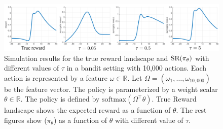 \begin{figure}[t]
\begin{center}
\includegraphics[width=1.0\linewidth]{./sr_simulation.pdf}
\end{center}
\caption{
Simulation results for the true reward landscape and $\text{SR}(\pi_\theta)$
with different values of $\tau$ in a bandit setting with 10,000 actions. Each action is represented by a feature $\omega\in \mathbb{R}$. Let $\Omega = \left( \omega_1, \dots, \omega_{10,000} \right)$ be the feature vector. The policy is parameterized by a weight scalar $\theta\in \mathbb{R}$. The policy is defined by $\text{softmax}(\Omega^{\top}\theta)$. True Reward landscape shows the expected reward as a function of $\theta$. The rest figures show \SR($\pi_\theta$) as a function of $\theta$ with different value of $\tau$.}
\label{fig:srsimulation}
\end{figure}



 













